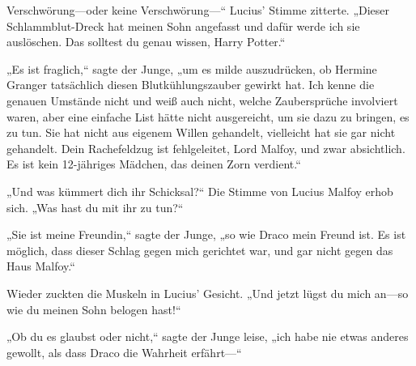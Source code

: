 Verschwörung—oder keine Verschwörung—“ Lucius' Stimme zitterte. „Dieser Schlammblut-Dreck hat meinen Sohn angefasst und dafür werde ich sie auslöschen. Das solltest du genau wissen, Harry Potter.“

„Es ist fraglich,“ sagte der Junge, „um es milde auszudrücken, ob Hermine Granger tatsächlich diesen Blutkühlungszauber gewirkt hat. Ich kenne die genauen Umstände nicht und weiß auch nicht, welche Zaubersprüche involviert waren, aber eine einfache List hätte nicht ausgereicht, um sie dazu zu bringen, es zu tun. Sie hat nicht aus eigenem Willen gehandelt, vielleicht hat sie gar nicht gehandelt. Dein Rachefeldzug ist fehlgeleitet, Lord Malfoy, und zwar absichtlich. Es ist kein 12-jähriges Mädchen, das deinen Zorn verdient.“

„Und was kümmert dich ihr Schicksal?“ Die Stimme von Lucius Malfoy erhob sich. „Was hast du mit ihr zu tun?“

„Sie ist meine Freundin,“ sagte der Junge, „so wie Draco mein Freund ist. Es ist möglich, dass dieser Schlag gegen mich gerichtet war, und gar nicht gegen das Haus Malfoy.“

Wieder zuckten die Muskeln in Lucius' Gesicht.
„Und jetzt lügst du mich an—so wie du meinen Sohn belogen hast!“

„Ob du es glaubst oder nicht,“ sagte der Junge leise, „ich habe nie etwas anderes gewollt, als dass Draco die Wahrheit erfährt—“

